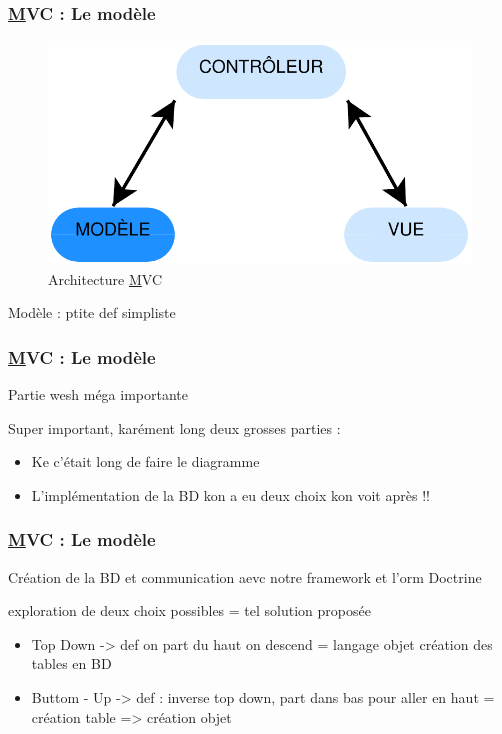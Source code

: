 \speaker{\Michel}

\begin{frame}
\frametitle{\underline{M}VC : Le modèle}
\begin{figure}[!h]
	\begin{center}
	\includegraphics[scale=0.5]{images/mvcModele}
	\caption{Architecture \underline{M}VC}
	\end{center}
\end{figure}
Modèle :  ptite def simpliste
\end{frame}

\begin{frame}
	\frametitle{\underline{M}VC : Le modèle}
	\begin{block}{Partie wesh méga importante }
		
	
		Super important, karément long deux grosses parties :
		\begin{itemize}
			\item Ke c'était long de faire le diagramme 
			\item L'implémentation de la BD kon a eu deux choix kon voit après !!
		\end{itemize}
	\end{block}
\end{frame}

\begin{frame}
	\frametitle{\underline{M}VC : Le modèle}
	\begin{block}{Création de la BD et communication aevc notre framework et l'orm Doctrine}
		
		exploration de deux choix possibles = tel solution proposée
		\begin{itemize}
			\item Top Down -> def on part du haut on descend = langage objet création des tables en BD
			\item Buttom - Up -> def : inverse top down, part dans bas pour aller en haut = création table => création objet
		\end{itemize}
	\end{block} 
\end{frame}

